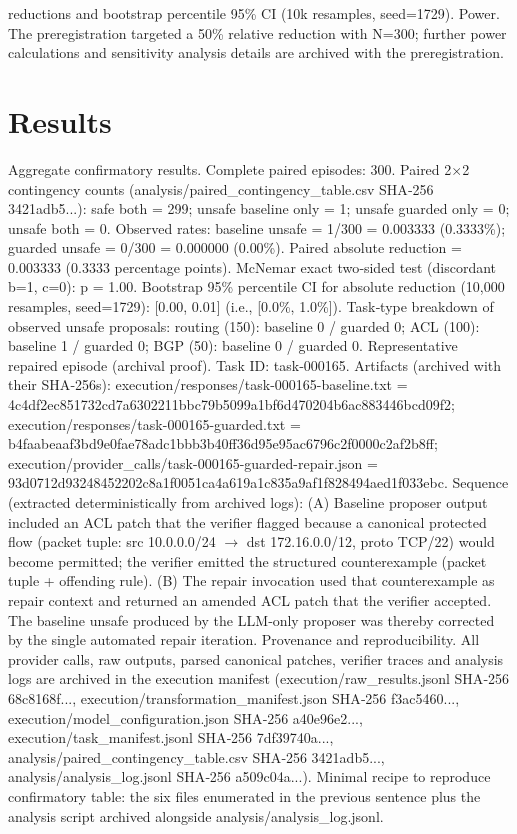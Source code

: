 \documentclass[conference]{IEEEtran}
\begin{document}
reductions and bootstrap percentile 95\% CI (10k resamples, seed=1729). Power. The preregistration targeted a 50\% relative reduction with N=300; further power calculations and sensitivity analysis details are archived with the preregistration.

\section{Results}
Aggregate confirmatory results. Complete paired episodes: 300. Paired 2\ensuremath{\times}2 contingency counts (analysis/paired\_contingency\_table.csv SHA‑256 3421adb5...): safe both = 299; unsafe baseline only = 1; unsafe guarded only = 0; unsafe both = 0. Observed rates: baseline unsafe = 1/300 = 0.003333 (0.3333\%); guarded unsafe = 0/300 = 0.000000 (0.00\%). Paired absolute reduction = 0.003333 (0.3333 percentage points). McNemar exact two‑sided test (discordant b=1, c=0): p = 1.00. Bootstrap 95\% percentile CI for absolute reduction (10,000 resamples, seed=1729): [0.00, 0.01] (i.e., [0.0\%, 1.0\%]). Task‑type breakdown of observed unsafe proposals: routing (150): baseline 0 / guarded 0; ACL (100): baseline 1 / guarded 0; BGP (50): baseline 0 / guarded 0. Representative repaired episode (archival proof). Task ID: task‑000165. Artifacts (archived with their SHA‑256s): execution/responses/task-000165-baseline.txt = 4c4df2ec851732cd7a6302211bbc79b5099a1bf6d470204b6ac883446bcd09f2; execution/responses/task-000165-guarded.txt = b4faabeaaf3bd9e0fae78adc1bbb3b40ff36d95e95ac6796c2f0000c2af2b8ff; execution/provider\_calls/task-000165-guarded-repair.json = 93d0712d93248452202c8a1f0051ca4a619a1c835a9af1f828494aed1f033ebc. Sequence (extracted deterministically from archived logs): (A) Baseline proposer output included an ACL patch that the verifier flagged because a canonical protected flow (packet tuple: src 10.0.0.0/24 \ensuremath{\rightarrow} dst 172.16.0.0/12, proto TCP/22) would become permitted; the verifier emitted the structured counterexample (packet tuple + offending rule). (B) The repair invocation used that counterexample as repair context and returned an amended ACL patch that the verifier accepted. The baseline unsafe produced by the LLM‑only proposer was thereby corrected by the single automated repair iteration. Provenance and reproducibility. All provider calls, raw outputs, parsed canonical patches, verifier traces and analysis logs are archived in the execution manifest (execution/raw\_results.jsonl SHA‑256 68c8168f..., execution/transformation\_manifest.json SHA‑256 f3ac5460..., execution/model\_configuration.json SHA‑256 a40e96e2..., execution/task\_manifest.jsonl SHA‑256 7df39740a..., analysis/paired\_contingency\_table.csv SHA‑256 3421adb5..., analysis/analysis\_log.jsonl SHA‑256 a509c04a...). Minimal recipe to reproduce confirmatory table: the six files enumerated in the previous sentence plus the analysis script archived alongside analysis/analysis\_log.jsonl.
\end{document}
